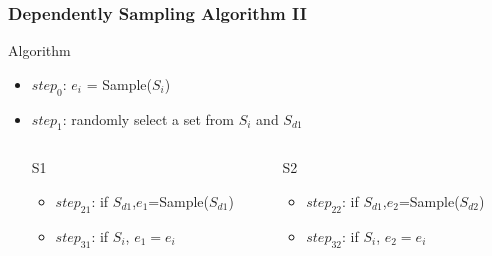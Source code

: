 \documentclass[notheorems, aspectratio=54]{beamer}
\begin{document}
\begin{frame}
    \frametitle{Dependently Sampling Algorithm II}
    \begin{block}{Algorithm}
        \begin{itemize}
            \item $step_{0}$: $e_i$ = Sample($S_i$)
            \item $step_{1}$: randomly select a set from $S_i$ and $S_{d1}$
            \begin{columns}
                \begin{column}{0.48\textwidth}
                    \begin{alertblock}{S1}
                        \begin{itemize}
                            \item $step_{21}$: if $S_{d1}$,$e_1$=Sample($S_{d1}$)
                            \item $step_{31}$: if $S_i$, $e_1=e_i$
                        \end{itemize}
                    \end{alertblock}
                    \end{column}
                    \begin{column}{0.48\textwidth}
                    \begin{alertblock}{S2}
                        \begin{itemize}
                            \item $step_{22}$: if $S_{d1}$,$e_2$=Sample($S_{d2}$)
                            \item $step_{32}$: if $S_i$, $e_2=e_i$
                        \end{itemize}
                    \end{alertblock}
                \end{column}
            \end{columns}
        \end{itemize}
    \end{block}
\end{frame}
\end{document}
